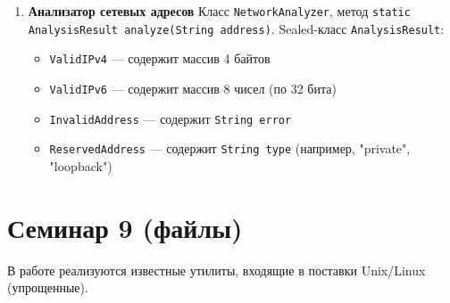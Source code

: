 \documentclass[12pt]{article}
\begin{document}
\begin{enumerate}
\item[25] \textbf{Анализатор сетевых адресов}
Класс \texttt{NetworkAnalyzer}, метод
\texttt{static AnalysisResult analyze(String address)}.
Sealed-класс \texttt{AnalysisResult}:
\begin{itemize}
\item \texttt{ValidIPv4} — содержит массив 4 байтов
\item \texttt{ValidIPv6} — содержит массив 8 чисел (по 32 бита)
\item \texttt{InvalidAddress} — содержит \texttt{String error}
\item \texttt{ReservedAddress} — содержит \texttt{String type} (например, "private", "loopback")
\end{itemize}
\end{enumerate}

\section{Семинар 9 (файлы)}

В работе реализуются известные утилиты, входящие в поставки Unix/Linux (упрощенные).
\end{document}
